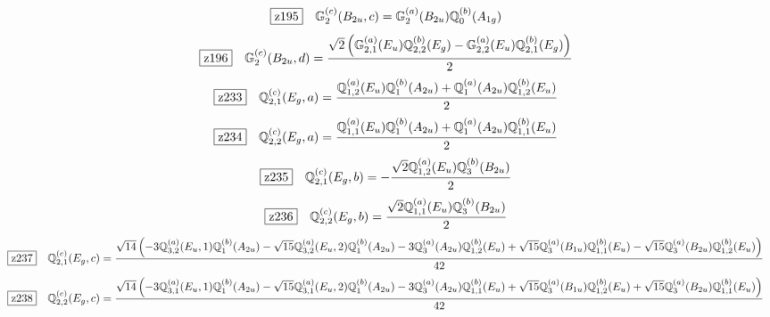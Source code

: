 \documentclass[fleqn,10pt,landscape]{jsarticle}
\begin{document}
\begin{dmath*}
\hspace*{3mm}\fbox{z195}\quad \mathbb{G}_{2}^{(c)}(B_{2u},c)=\mathbb{G}_{2}^{(a)}(B_{2u}) \mathbb{Q}_{0}^{(b)}(A_{1g})
\end{dmath*}
\begin{dmath*}
\hspace*{3mm}\fbox{z196}\quad \mathbb{G}_{2}^{(c)}(B_{2u},d)=\frac{\sqrt{2} \left(\mathbb{G}_{2,1}^{(a)}(E_{u}) \mathbb{Q}_{2,2}^{(b)}(E_{g}) - \mathbb{G}_{2,2}^{(a)}(E_{u}) \mathbb{Q}_{2,1}^{(b)}(E_{g})\right)}{2}
\end{dmath*}
\begin{dmath*}
\hspace*{3mm}\fbox{z233}\quad \mathbb{Q}_{2,1}^{(c)}(E_{g},a)=\frac{\mathbb{Q}_{1,2}^{(a)}(E_{u}) \mathbb{Q}_{1}^{(b)}(A_{2u}) + \mathbb{Q}_{1}^{(a)}(A_{2u}) \mathbb{Q}_{1,2}^{(b)}(E_{u})}{2}
\end{dmath*}
\begin{dmath*}
\hspace*{3mm}\fbox{z234}\quad \mathbb{Q}_{2,2}^{(c)}(E_{g},a)=\frac{\mathbb{Q}_{1,1}^{(a)}(E_{u}) \mathbb{Q}_{1}^{(b)}(A_{2u}) + \mathbb{Q}_{1}^{(a)}(A_{2u}) \mathbb{Q}_{1,1}^{(b)}(E_{u})}{2}
\end{dmath*}
\begin{dmath*}
\hspace*{3mm}\fbox{z235}\quad \mathbb{Q}_{2,1}^{(c)}(E_{g},b)=- \frac{\sqrt{2} \mathbb{Q}_{1,2}^{(a)}(E_{u}) \mathbb{Q}_{3}^{(b)}(B_{2u})}{2}
\end{dmath*}
\begin{dmath*}
\hspace*{3mm}\fbox{z236}\quad \mathbb{Q}_{2,2}^{(c)}(E_{g},b)=\frac{\sqrt{2} \mathbb{Q}_{1,1}^{(a)}(E_{u}) \mathbb{Q}_{3}^{(b)}(B_{2u})}{2}
\end{dmath*}
\begin{dmath*}
\hspace*{3mm}\fbox{z237}\quad \mathbb{Q}_{2,1}^{(c)}(E_{g},c)=\frac{\sqrt{14} \left(- 3 \mathbb{Q}_{3,2}^{(a)}(E_{u},1) \mathbb{Q}_{1}^{(b)}(A_{2u}) - \sqrt{15} \mathbb{Q}_{3,2}^{(a)}(E_{u},2) \mathbb{Q}_{1}^{(b)}(A_{2u}) - 3 \mathbb{Q}_{3}^{(a)}(A_{2u}) \mathbb{Q}_{1,2}^{(b)}(E_{u}) + \sqrt{15} \mathbb{Q}_{3}^{(a)}(B_{1u}) \mathbb{Q}_{1,1}^{(b)}(E_{u}) - \sqrt{15} \mathbb{Q}_{3}^{(a)}(B_{2u}) \mathbb{Q}_{1,2}^{(b)}(E_{u})\right)}{42}
\end{dmath*}
\begin{dmath*}
\hspace*{3mm}\fbox{z238}\quad \mathbb{Q}_{2,2}^{(c)}(E_{g},c)=\frac{\sqrt{14} \left(- 3 \mathbb{Q}_{3,1}^{(a)}(E_{u},1) \mathbb{Q}_{1}^{(b)}(A_{2u}) - \sqrt{15} \mathbb{Q}_{3,1}^{(a)}(E_{u},2) \mathbb{Q}_{1}^{(b)}(A_{2u}) - 3 \mathbb{Q}_{3}^{(a)}(A_{2u}) \mathbb{Q}_{1,1}^{(b)}(E_{u}) + \sqrt{15} \mathbb{Q}_{3}^{(a)}(B_{1u}) \mathbb{Q}_{1,2}^{(b)}(E_{u}) + \sqrt{15} \mathbb{Q}_{3}^{(a)}(B_{2u}) \mathbb{Q}_{1,1}^{(b)}(E_{u})\right)}{42}
\end{dmath*}
\end{document}
